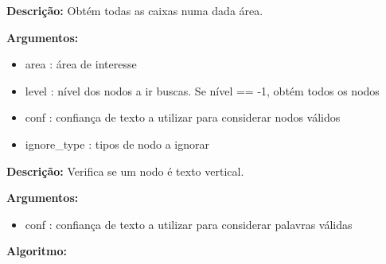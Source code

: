 
\textbf{Descrição:} Obtém todas as caixas numa dada área.


\textbf{Argumentos:}
\begin{itemize}\setlength\itemsep{-0.3em}
	\item area : área de interesse
	\item level : nível dos nodos a ir buscas. Se nível == -1, obtém todos os nodos
	\item conf : confiança de texto a utilizar para considerar nodos válidos
	\item ignore\_type : tipos de nodo a ignorar
\end{itemize}
	
	

\textbf{Descrição:} Verifica se um nodo é texto vertical.

\textbf{Argumentos:}
\begin{itemize}\setlength\itemsep{-0.3em}
	\item conf : confiança de texto a utilizar para considerar palavras válidas
\end{itemize}
	
\textbf{Algoritmo:}

